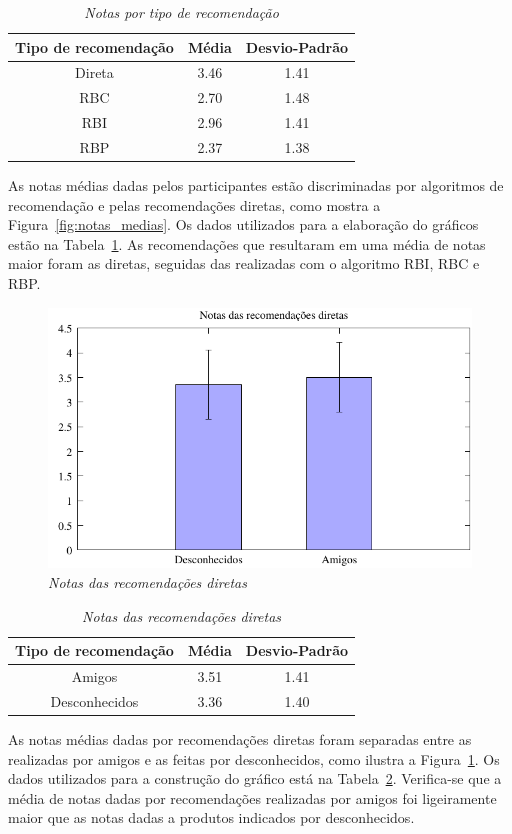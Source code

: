 \begin{table}
\centering
\begin{tabular}{c c c}
    \hline \hline
    \textbf{Tipo de recomendação} & \textbf{Média}& \textbf{Desvio-Padrão} \\
\hline 
Direta & 3.46 & 1.41 \\
\hline 
RBC & 2.70 & 1.48 \\
\hline 
RBI & 2.96 & 1.41 \\
\hline 
RBP & 2.37 & 1.38 \\
\hline        
\end{tabular}
\caption{\it Notas por tipo de recomendação}
\label{table:notas_medias}
\end{table}
 As notas médias dadas pelos participantes estão discriminadas por algoritmos de recomendação e pelas recomendações diretas, como mostra a Figura~\ref{fig:notas_medias}. Os dados utilizados para a elaboração do gráficos estão na Tabela~\ref{table:notas_medias}. As recomendações que resultaram em uma média de notas maior foram as diretas, seguidas das realizadas com o algoritmo RBI, RBC e RBP.


\begin{figure}
    \centering
    \includegraphics[width=\textwidth]{imagens/grafico_notas_medias_diretas}
    \caption{\it Notas das recomendações diretas}
    \label{fig:notas_medias_diretas}
\end{figure}

\begin{table}
\centering
\begin{tabular}{c c c}
    \hline \hline
    \textbf{Tipo de recomendação} & \textbf{Média}& \textbf{Desvio-Padrão} \\
\hline 
Amigos & 3.51 & 1.41 \\
\hline 
Desconhecidos & 3.36 & 1.40 \\
\hline        
\end{tabular}
\caption{\it Notas das recomendações diretas}
\label{table:notas_medias_diretas}
\end{table}
 As notas médias dadas por recomendações diretas foram separadas entre as realizadas por amigos e as feitas por desconhecidos, como ilustra a Figura~\ref{fig:notas_medias_diretas}. Os dados utilizados para a construção do gráfico está na Tabela~\ref{table:notas_medias_diretas}. Verifica-se que a média de notas dadas por recomendações realizadas por amigos foi ligeiramente maior que as notas dadas a produtos indicados por desconhecidos.

